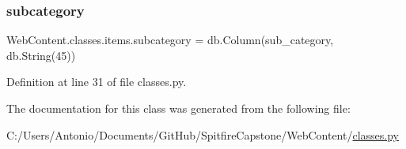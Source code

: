 \subsubsection{\texorpdfstring{subcategory}{subcategory}}
{\footnotesize\ttfamily Web\+Content.\+classes.\+items.\+subcategory = db.\+Column(\textquotesingle{}sub\+\_\+category\textquotesingle{}, db.\+String(45))\hspace{0.3cm}{\ttfamily [static]}}



Definition at line 31 of file classes.\+py.



The documentation for this class was generated from the following file\+:\begin{DoxyCompactItemize}
\item 
C\+:/\+Users/\+Antonio/\+Documents/\+Git\+Hub/\+Spitfire\+Capstone/\+Web\+Content/\hyperlink{classes_8py}{classes.\+py}\end{DoxyCompactItemize}
